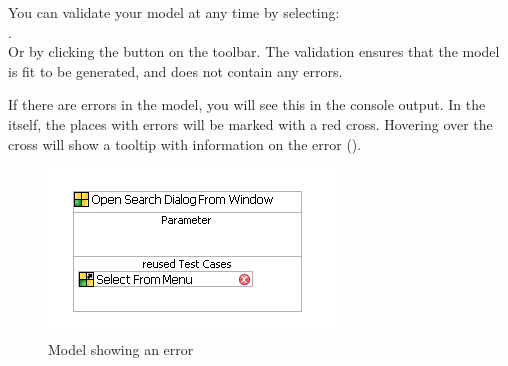 
You can validate your model at any time by selecting:\\
. \\


Or by clicking the  button on the toolbar.
The validation ensures that the model is fit to be generated, and does not contain any errors. 

If there are errors in the model, you will see this in the console output. In the \gdmodeleditor{} itself, the places with errors will be marked with a red cross. Hovering over the cross will show a tooltip with information on the error (). 

\begin{figure}
\begin{center}
\includegraphics{Tasks/Modelling/PS/ModelError}
\caption{Model showing an error}
\label{ModelError}
\end{center}
\end{figure} 
